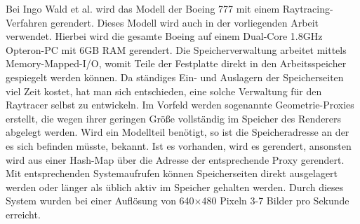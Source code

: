 Bei Ingo Wald et al. \cite{wald} wird das Modell der Boeing 777 mit einem Raytracing-Verfahren gerendert. Dieses Modell wird auch in der vorliegenden Arbeit verwendet. Hierbei wird die gesamte Boeing auf einem Dual-Core 1.8GHz Opteron-PC mit 6GB RAM gerendert. Die Speicherverwaltung arbeitet mittels Memory-Mapped-I/O, womit Teile der Festplatte direkt in den Arbeitsspeicher gespiegelt werden können. Da ständiges Ein- und Auslagern der Speicherseiten viel Zeit kostet, hat man sich entschieden, eine solche Verwaltung für den Raytracer selbst zu entwickeln. Im Vorfeld werden sogenannte Geometrie-Proxies erstellt, die wegen ihrer geringen Größe vollständig im Speicher des Renderers abgelegt werden. Wird ein Modellteil benötigt, so ist die Speicheradresse an der es sich befinden müsste, bekannt. Ist es vorhanden, wird es gerendert, ansonsten wird aus einer Hash-Map über die Adresse der entsprechende Proxy gerendert. Mit entsprechenden Systemaufrufen können Speicherseiten direkt ausgelagert werden oder länger als üblich aktiv im Speicher gehalten werden. Durch dieses System wurden bei einer Auflösung von 640$\times$480 Pixeln 3-7 Bilder pro Sekunde erreicht.

%
